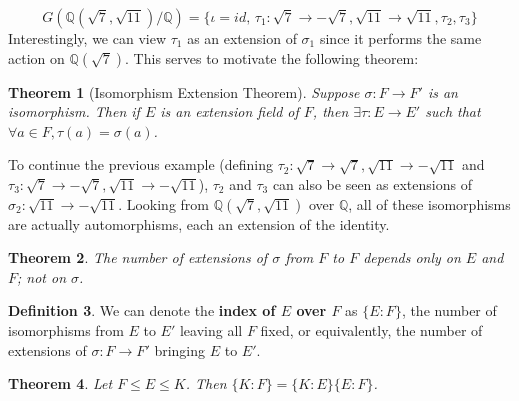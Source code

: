 \documentclass[11pt]{amsart}
\newtheorem{theorem}{Theorem}[section]
\theoremstyle{definition}
\newtheorem{definition}[theorem]{Definition}
\newcommand{\rationals}{\mathbb{Q}}
\begin{document}
\[
	G(\rationals(\sqrt{7}, \sqrt{11}) / \rationals) = \{ \iota = id, \, \tau_1: \sqrt{7} \to -\sqrt{7}, \sqrt{11} \to \sqrt{11}, \tau_2, \tau_3 \}
\]
Interestingly, we can view $\tau_1$ as an extension of $\sigma_1$ since it performs the same action on $\rationals(\sqrt{7})$. This serves to
motivate the following theorem:
\begin{theorem}[Isomorphism Extension Theorem]
	Suppose $\sigma: F \to F'$ is an isomorphism. Then if $E$ is an extension field of $F$, then $\exists \tau: E \to E'$ such that 
	$\forall a \in F, \tau(a) = \sigma(a)$.
\end{theorem}
To continue the previous example (defining $\tau_2: \sqrt{7} \to \sqrt{7}, \sqrt{11} \to -\sqrt{11}$ and $\tau_3: \sqrt{7} \to -\sqrt{7}, \sqrt{11} \to
-\sqrt{11}$), $\tau_2$ and $\tau_3$ can also be seen as extensions of $\sigma_2: \sqrt{11} \to -\sqrt{11}$. Looking from 
$\rationals(\sqrt{7}, \sqrt{11})$ over $\rationals$, all of these isomorphisms are actually automorphisms, each an extension of the identity.
\begin{theorem}
	The number of extensions of $\sigma$ from $F$ to $F$ depends only on $E$ and $F$; not on $\sigma$.
\end{theorem}
\begin{definition}
	We can denote the \textbf{index of $E$ over $F$} as $\{ E : F \}$, the number of isomorphisms from $E$ to $E'$ leaving all $F$ fixed, or
	equivalently, the number of extensions of $\sigma: F \to F'$ bringing $E$ to $E'$.
\end{definition}
\begin{theorem}
	Let $F \leq E \leq K$. Then $\{ K : F \} = \{ K : E \}\{ E : F \}$.
\end{theorem}
\end{document}
